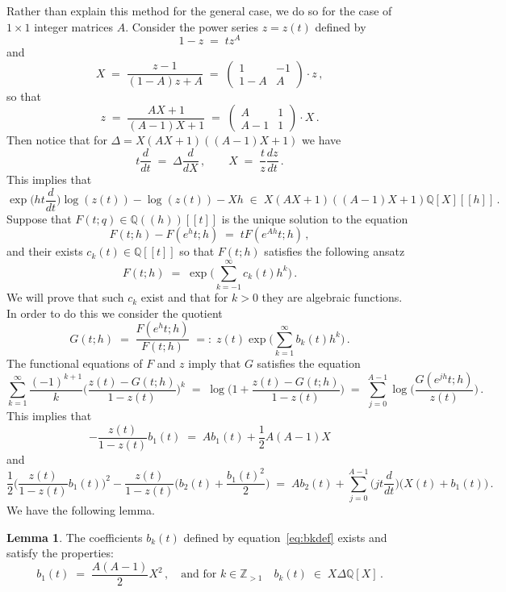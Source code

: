 \documentclass[12pt,reqno]{amsart}
\theoremstyle{definition}
\newtheorem{lemma}[proposition]{Lemma}
\def\BZ{\mathbb Z}
\def\BQ{\mathbb Q}
\def\be{\begin{equation}}
\def\ee{\end{equation}}
\def\={\;=\;}
\def\inn{\;\in\;}
\begin{document}
Rather than explain this method for the general case, we do so for the
case of $1 \times 1$ integer matrices $A$. Consider the power series $z=z(t)$ defined
by
\be
1-z\=tz^A
\ee
and
\be
X\=\frac{z-1}{(1-A)z+A}
\=
\begin{pmatrix}
1 & -1\\
1-A & A
\end{pmatrix}
\cdot
z\,,
\ee
so that 
\be\label{eq:XZrel}
z\=\frac{AX+1}{(A-1)X+1}
\=
\begin{pmatrix}
A & 1\\
A-1 & 1
\end{pmatrix}
\cdot
X \,.
\ee
Then notice that for $\Delta=X(AX+1)((A-1)X+1)$ we have
\be
t\frac{d}{dt} \= \Delta\frac{d}{dX} \,, \qquad
X \= \frac{t}{z}\frac{dz}{dt}\,.
\ee
This implies that
\be
\label{eq:logz}
\exp\Big(h t\frac{d}{dt}\Big)\log(z(t))-\log(z(t))-Xh \inn
X(AX+1)((A-1)X+1)\BQ[X][\![h]\!]\,.
\ee
Suppose that $F(t;q)\in\BQ(\!(h)\!)[\![t]\!]$ is the unique solution to the equation
\be
  F(t;h)-F(e^{h}t;h)\=tF(e^{Ah}t;h)\,,
\ee
and their exists $c_k(t)\in\BQ[\![t]\!]$ so that $F(t;h)$ satisfies the following
ansatz
\be
F(t;h) \= \exp\Big(\sum_{k=-1}^{\infty}c_k(t)h^{k}\Big)\,.
\ee
We will prove that such $c_k$ exist and that for $k>0$ they are algebraic functions.
In order to do this we consider the quotient
\be\label{eq:bkdef}
G(t;h) \= \frac{F(e^h t;h)}{F(t;h)}
\;=:\; z(t)\exp\Big(\sum_{k=1}^{\infty}b_k(t)h^k\Big)\,.
\ee
The functional equations of $F$ and $z$ imply that $G$ satisfies the equation
\be
\label{eq:funeqG}
\sum_{k=1}^{\infty}\frac{(-1)^{k+1}}{k}
\Big(\frac{z(t)-G(t;h)}{1-z(t)}\Big)^k
\= \log\Big(1+\frac{z(t)-G(t;h)}{1-z(t)}\Big)
\= \sum_{j=0}^{A-1}\log\Big(\frac{G(e^{jh}t;h)}{z(t)}\Big)\,.
\ee
This implies that
\be
\label{eq:b1}
-\frac{z(t)}{1-z(t)}b_{1}(t) \= Ab_{1}(t)+\frac{1}{2}A(A-1)X
\ee
and
\be\label{eq:b1andb2}
\frac{1}{2}\Big(\frac{z(t)}{1-z(t)}b_{1}(t)\Big)^2-\frac{z(t)}{1-z(t)}
\Big(b_{2}(t)+\frac{b_{1}(t)^2}{2}\Big)
\= Ab_{2}(t)+\sum_{j=0}^{A-1}\Big(jt\frac{d}{dt}\Big)\big(X(t)+b_1(t)\big)\,.
\ee
We have the following lemma.

\begin{lemma}
The coefficients $b_{k}(t)$ defined by equation~\eqref{eq:bkdef} exists and satisfy
the properties:
\be
b_{1}(t) \= \frac{A(A-1)}{2}X^2\,,
\quad\text{and for }k\in\BZ_{>1}\quad b_{k}(t)\inn X\Delta\BQ[X]\,.
\ee
\end{lemma}
\end{document}
